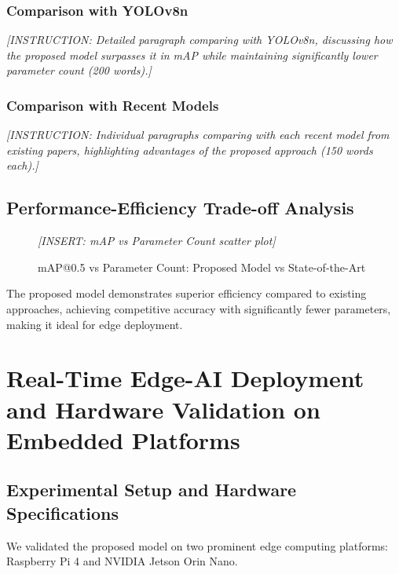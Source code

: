 \documentclass[11pt,a4paper]{article}
\begin{document}
\subsubsection{Comparison with YOLOv8n}

\textit{[INSTRUCTION: Detailed paragraph comparing with YOLOv8n, discussing how the proposed model 
surpasses it in mAP while maintaining significantly lower parameter count (200 words).]}

\subsubsection{Comparison with Recent Models}

\textit{[INSTRUCTION: Individual paragraphs comparing with each recent model from existing papers, 
highlighting advantages of the proposed approach (150 words each).]}

\subsection{Performance-Efficiency Trade-off Analysis}

\begin{figure}[H]
    \centering
    \textit{[INSERT: mAP vs Parameter Count scatter plot]}
    \caption{mAP@0.5 vs Parameter Count: Proposed Model vs State-of-the-Art}
    \label{fig:efficiency_tradeoff}
\end{figure}

The proposed model demonstrates superior efficiency compared to existing approaches, achieving 
competitive accuracy with significantly fewer parameters, making it ideal for edge deployment.


\section{Real-Time Edge-AI Deployment and Hardware Validation on Embedded Platforms}
\label{sec:deployment}

\subsection{Experimental Setup and Hardware Specifications}

We validated the proposed model on two prominent edge computing platforms: Raspberry Pi 4 and 
NVIDIA Jetson Orin Nano.
\end{document}
